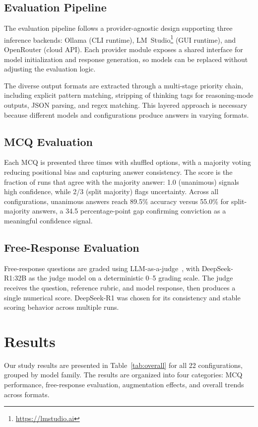 \documentclass[conference]{IEEEtran}
\begin{document}
\subsection{Evaluation Pipeline}

The evaluation pipeline follows a provider-agnostic design supporting three inference backends: Ollama (CLI runtime), LM~Studio\footnote{\url{https://lmstudio.ai}} (GUI runtime), and OpenRouter (cloud API). Each provider module exposes a shared interface for model initialization and response generation, so models can be replaced without adjusting the evaluation logic.

The diverse output formats are extracted through a multi-stage priority chain, including explicit pattern matching, stripping of thinking tags for reasoning-mode outputs, JSON parsing, and regex matching. This layered approach is necessary because different models and configurations produce answers in varying formats.

\subsection{MCQ Evaluation}

Each MCQ is presented three times with shuffled options, with a majority voting reducing positional bias and capturing answer consistency. The score is the fraction of runs that agree with the majority answer: 1.0 (unanimous) signals high confidence, while 2/3 (split majority) flags uncertainty. Across all configurations, unanimous answers reach 89.5\% accuracy versus 55.0\% for split-majority answers, a 34.5 percentage-point gap confirming conviction as a meaningful confidence signal.

\subsection{Free-Response Evaluation}

Free-response questions are graded using LLM-as-a-judge~\cite{b8}, with DeepSeek-R1:32B as the judge model on a deterministic 0--5 grading scale. The judge receives the question, reference rubric, and model response, then produces a single numerical score. DeepSeek-R1 was chosen for its consistency and stable scoring behavior across multiple runs.
\section{Results}
\label{sec:results}

Our study results are presented in Table~\ref{tab:overall} for all 22 configurations, grouped by model family. The results are organized into four categories: MCQ performance, free-response evaluation, augmentation effects, and overall trends across formats.
\end{document}
